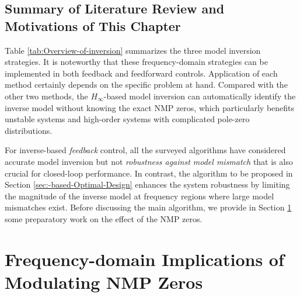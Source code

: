 \documentclass [11pt, proquest] {uwthesis}[2020/02/24]
\begin{document}
\subsection{Summary of Literature Review and Motivations of This Chapter}

Table \ref{tab:Overview-of-inversion} summarizes the three model
inversion strategies. It is noteworthy that these frequency-domain
strategies can be implemented in both feedback and feedforward controls.
Application of each method certainly depends on the specific problem
at hand. Compared with the other two methods, the $H_{\infty}$-based model
inversion can automatically identify the inverse model without knowing
the exact NMP zeros, which particularly benefits unstable systems
and high-order systems with complicated pole-zero distributions.

For inverse-based \emph{feedback} control, all the surveyed algorithms
have considered accurate model inversion but not \emph{robustness
against model mismatch} that is also crucial for closed-loop performance.
In contrast, the algorithm to be proposed in Section \ref{sec:-based-Optimal-Design}
enhances the system robustness by limiting the magnitude of the inverse
model at frequency regions where large model mismatches exist. Before
discussing the main algorithm, we provide in Section \ref{sec:NMP-zero-Modulation}
some preparatory work on the effect of the NMP zeros.

\section{Frequency-domain Implications of Modulating NMP Zeros} \label{sec:NMP-zero-Modulation}
\end{document}
